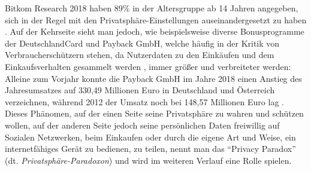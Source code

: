 Bitkom Research 2018 haben 89\% in der Altersgruppe ab 14 Jahren angegeben, sich in der Regel mit den Privatsphäre-Einstellungen auseinandergesetzt zu haben \cite{Bitkom:2018aa}. Auf der Kehrseite sieht man jedoch, wie beispielsweise diverse Bonusprogramme der DeutschlandCard und Payback GmbH, welche häufig in der Kritik von 
Verbraucherschützern stehen, da Nutzerdaten zu den Einkäufen und dem Einkaufsverhalten gesammelt werden \cite{Hatke:aa}, immer größer und verbreiteter werden: Alleine zum Vorjahr konnte die Payback GmbH im Jahre 2018 einen Anstieg des Jahresumsatzes auf 330,49 Millionen Euro in Deutschland und Österreich verzeichnen, während 2012 der Umsatz noch bei 148,57 Millionen 
Euro lag \cite{Payback:2019aa}. \\ Dieses Phänomen, auf der einen Seite seine Privatsphäre zu wahren und schützen wollen, auf der anderen Seite jedoch seine persönlichen Daten freiwillig auf Sozialen Netzwerken, beim Einkaufen oder durch die eigene Art und Weise, ein internetfähiges Gerät zu bedienen, zu teilen, nennt man das \enquote{Privacy Paradox} (dt. 
\textit{Privatsphäre-Paradoxon}) \cite{Barnes:2006aa} und wird im weiteren Verlauf eine Rolle spielen.